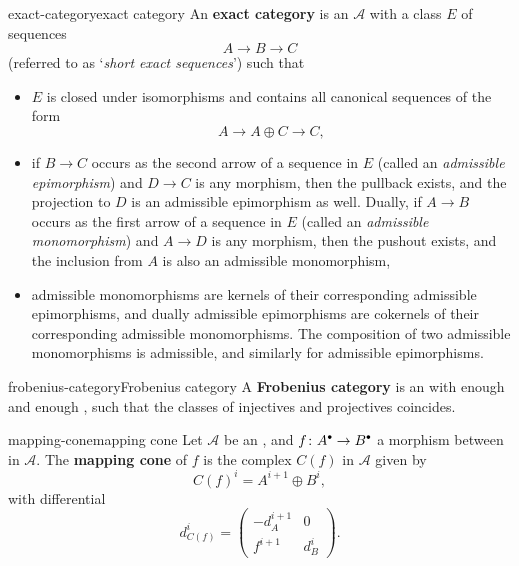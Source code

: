 \begin{topic}{exact-category}{exact category}
    An \textbf{exact category} is an  $\mathcal{A}$ with a class $E$ of sequences
    \[ A \to B \to C \]
    (referred to as `\textit{short exact sequences}') such that
    \begin{itemize}
        \item $E$ is closed under isomorphisms and contains all canonical sequences of the form
        \[ A \to A \oplus C \to C , \]
        \item if $B \to C$ occurs as the second arrow of a sequence in $E$ (called an \textit{admissible epimorphism}) and $D \to C$ is any morphism, then the pullback exists, and the projection to $D$ is an admissible epimorphism as well. Dually, if $A \to B$ occurs as the first arrow of a sequence in $E$ (called an \textit{admissible monomorphism}) and $A \to D$ is any morphism, then the pushout exists, and the inclusion from $A$ is also an admissible monomorphism,
        \item admissible monomorphisms are kernels of their corresponding admissible epimorphisms, and dually admissible epimorphisms are cokernels of their corresponding admissible monomorphisms. The composition of two admissible monomorphisms is admissible, and similarly for admissible epimorphisms.
    \end{itemize}
\end{topic}

\begin{topic}{frobenius-category}{Frobenius category}
    A \textbf{Frobenius category} is an  with enough  and enough , such that the classes of injectives and projectives coincides.
\end{topic}

\begin{topic}{mapping-cone}{mapping cone}
    Let $\mathcal{A}$ be an , and $f \colon A^\bdot \to B^\bdot$ a morphism between  in $\mathcal{A}$. The \textbf{mapping cone} of $f$ is the complex $C(f)$ in $\mathcal{A}$ given by
    \[ C(f)^i = A^{i + 1} \oplus B^i , \]
    with differential
    \[ d_{C(f)}^i = \begin{pmatrix} -d_A^{i + 1} & 0 \\ f^{i + 1} & d_B^i \end{pmatrix} . \]    
\end{topic}

